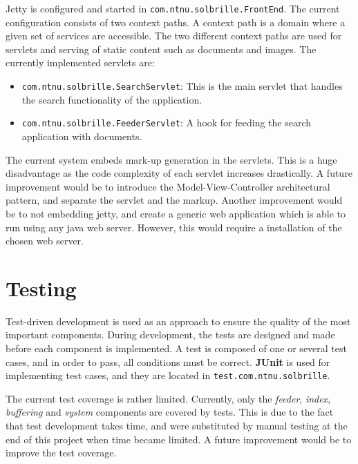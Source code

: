 Jetty is configured and started in {\tt com.ntnu.solbrille.FrontEnd}. The current configuration consists of two context paths. A context path is a domain where a given set of services are accessible. The two different context paths are used for servlets and serving of static content such as documents and images. The currently implemented servlets are:

\begin{itemize}
\item {\tt com.ntnu.solbrille.SearchServlet}: This is the main servlet that handles the search functionality of the application.
\item {\tt com.ntnu.solbrille.FeederServlet}: A hook for feeding the search application with documents.
\end{itemize}

The current system embeds mark-up generation in the servlets. This is a huge disadvantage as the code complexity of each servlet increases drastically. A future improvement would be to introduce the Model-View-Controller architectural pattern, and separate the servlet and the markup. Another improvement would be to not embedding jetty, and create a generic web application which is able to run using any java web server. However, this would require a installation of the chosen web server.

\section{Testing}
Test-driven development is used as an approach to ensure the quality of the most important components. During development, the tests are designed and made before each component is implemented. A test is composed of one or several test cases, and in order to pass, all conditions must be correct. {\bf JUnit} is used for implementing test cases, and they are located in {\tt test.com.ntnu.solbrille}.

The current test coverage is rather limited. Currently, only the {\it feeder}, {\it index}, {\it buffering} and {\it system} components are covered by tests. This is due to the fact that test development takes time, and were substituted by manual testing at the end of this project when time became limited. A future improvement would be to improve the test coverage.


